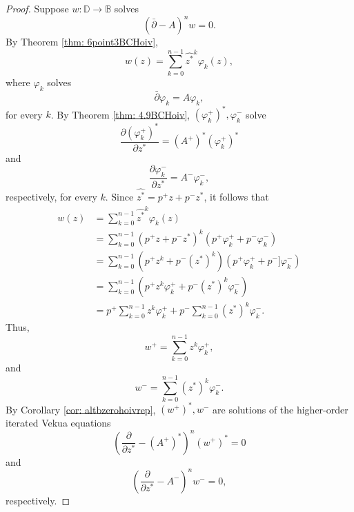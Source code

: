 \documentclass[12pt,reqno]{amsart}
\theoremstyle{definition}
\theoremstyle{remark}
\newcommand{\p}{\partial}
\newcommand{\dbar}{\bar\partial}
\newcommand{\bc}{\mathbb{B}}
\newcommand{\disk}{\mathbb{D}}
\begin{document}
            \begin{proof}
                Suppose $w: \disk\to\bc$ solves
                \[
                    (\dbar- A)^n w = 0.
                \]
                By Theorem \ref{thm: 6point3BCHoiv}, 
                \[
                    w(z) = \sum_{k=0}^{n-1} \widehat{z^*}^k \varphi_k(z),
                \]
                where $\varphi_k$ solves
                \[
                    \dbar \varphi_k = A \varphi_k,
                \]
                for every $k$. By Theorem \ref{thm: 4.9BCHoiv}, $(\varphi_k^+)^*, \varphi_k^-$ solve
                \[
                 \frac{\p (\varphi_k^+)^*}{\p z^*} = (A^+)^* (\varphi_k^+)^*
                \]
                and 
                \[
                    \frac{\p \varphi_k^-}{\p z^*} = A^-\varphi_k^-,
                \]
                respectively, for every $k$. Since $\widehat{z^*} = p^+ z + p^- z^*$, it follows that 
                \begin{align*}
                     w(z) &= \sum_{k=0}^{n-1} \widehat{z^*}^k \varphi_k(z)\\
                     &= \sum_{k=0}^{n-1} (p^+ z + p^- z^*)^k (p^+ \varphi_k^+ + p^- \varphi_k^-) \\
                     &= \sum_{k=0}^{n-1} (p^+ z^k + p^- (z^*)^k) (p^+ \varphi_k^+ + p^- ]\varphi_k^-) \\
                     &= \sum_{k=0}^{n-1} \left(p^+ z^k \varphi_k^+ + p^- (z^*)^k \varphi_k^-\right) \\
                     &= p^+ \sum_{k=0}^{n-1} z^k \varphi_k^+ + p^- \sum_{k=0}^{n-1} (z^*)^k \varphi_k^-.
                \end{align*}
                Thus, 
                \[
                    w^+ = \sum_{k=0}^{n-1} z^k \varphi_k^+ ,
                \]
                and
                \[
                    w^- = \sum_{k=0}^{n-1} (z^*)^k \varphi_k^-.
                \]
                By Corollary \ref{cor: altbzerohoivrep}, $(w^+)^*, w^-$ are solutions of the higher-order iterated Vekua equations
                \[
                    \left( \frac{\p }{\p z^*} - (A^+)^*\right)^n (w^+)^* = 0
                \]
                and 
                \[
                \left( \frac{\p}{\p z^*} - A^-\right)^n w^-= 0,
                \]
                respectively.  


\end{proof}
\end{document}
